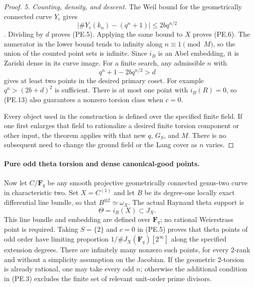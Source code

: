 \begin{proof}
\emph{5. Counting, density, and descent.}
The Weil bound for the geometrically connected curve $Y_c$ gives
\[
       \bigl|\#Y_c(k_n)-(q^n+1)\bigr|\le2bq^{n/2}
\]
\cite[Theorem~11.1]{MilneJV}. Dividing by $d$ proves (PE.5).
Applying the same bound to $X$ proves (PE.6).
The numerator in the lower bound tends to infinity along
$n\equiv1\pmod M$, so the union of the counted point sets is
infinite. Since $i_B$ is an Abel embedding, it is Zariski dense
in its curve image. For a finite search, any admissible $n$ with
\[
                  q^n+1-2bq^{n/2}>d
 \tag{PE.13}
\]
gives at least two points in the desired primary coset. For
example $q^n>(2b+d)^2$ is sufficient. There is at most one point
with $i_B(R)=0$, so (PE.13) also guarantees a nonzero torsion
class when $c=0$.

Every object used in the construction is defined over the
specified finite field. If one first enlarges that field to
rationalize a desired finite torsion component or other input,
the theorem applies with that new $q$, $G_S$, and $M$. There is
no subsequent need to change the ground field or the Lang cover
as $n$ varies.
\end{proof}

\paragraph{Pure odd theta torsion and dense canonical-good points.}
Now let $C/\mathbf F_q$ be any smooth projective geometrically
connected genus-two curve in characteristic two. Set
$X=C^{(1)}$ and let $B$ be its degree-one locally exact
differential line bundle, so that $B^{\otimes2}\simeq\omega_X$.
The actual Raynaud theta support is
\[
                   \Theta=i_B(X)\subset J_X.
 \tag{PE.14}
\]
This line bundle and embedding are defined over $\mathbf F_q$;
no rational Weierstrass point is required. Taking $S=\{2\}$ and
$c=0$ in (PE.5) proves that theta points of odd order have
limiting proportion $1/\#J_X(\mathbf F_q)[2^\infty]$ along the
specified extension degrees. There are infinitely many nonzero
such points, for every $2$-rank and without a simplicity
assumption on the Jacobian. If the geometric $2$-torsion is
already rational, one may take every odd $n$; otherwise the
additional condition in (PE.3) excludes the finite set of
relevant unit-order prime divisors.

